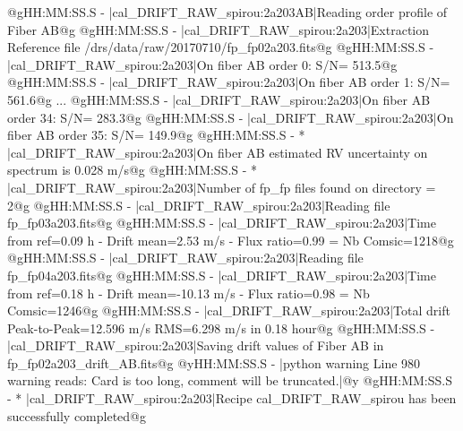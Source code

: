\begin{cmdboxprintspecial}[fontupper=\tiny, fontlower=\tiny]
@gHH:MM:SS.S -   |cal_DRIFT_RAW_spirou:2a203AB|Reading order profile of Fiber AB@g
@gHH:MM:SS.S -   |cal_DRIFT_RAW_spirou:2a203|Extraction Reference file /drs/data/raw/20170710/fp_fp02a203.fits@g
@gHH:MM:SS.S -   |cal_DRIFT_RAW_spirou:2a203|On fiber AB order 0: S/N= 513.5@g
@gHH:MM:SS.S -   |cal_DRIFT_RAW_spirou:2a203|On fiber AB order 1: S/N= 561.6@g
...
@gHH:MM:SS.S -   |cal_DRIFT_RAW_spirou:2a203|On fiber AB order 34: S/N= 283.3@g
@gHH:MM:SS.S -   |cal_DRIFT_RAW_spirou:2a203|On fiber AB order 35: S/N= 149.9@g
@gHH:MM:SS.S - * |cal_DRIFT_RAW_spirou:2a203|On fiber AB estimated RV uncertainty on spectrum is 0.028 m/s@g
@gHH:MM:SS.S - * |cal_DRIFT_RAW_spirou:2a203|Number of fp_fp files found on directory = 2@g
@gHH:MM:SS.S -   |cal_DRIFT_RAW_spirou:2a203|Reading file fp_fp03a203.fits@g
@gHH:MM:SS.S -   |cal_DRIFT_RAW_spirou:2a203|Time from ref=0.09 h  - Drift mean=2.53 m/s - Flux ratio=0.99 = Nb Comsic=1218@g
@gHH:MM:SS.S -   |cal_DRIFT_RAW_spirou:2a203|Reading file fp_fp04a203.fits@g
@gHH:MM:SS.S -   |cal_DRIFT_RAW_spirou:2a203|Time from ref=0.18 h  - Drift mean=-10.13 m/s - Flux ratio=0.98 = Nb Comsic=1246@g
@gHH:MM:SS.S -   |cal_DRIFT_RAW_spirou:2a203|Total drift Peak-to-Peak=12.596 m/s RMS=6.298 m/s in 0.18 hour@g
@gHH:MM:SS.S -   |cal_DRIFT_RAW_spirou:2a203|Saving drift values of Fiber AB in fp_fp02a203_drift_AB.fits@g
@yHH:MM:SS.S - \@ |python warning Line 980  warning reads: Card is too long, comment will be truncated.|@y
@gHH:MM:SS.S - * |cal_DRIFT_RAW_spirou:2a203|Recipe cal_DRIFT_RAW_spirou has been successfully completed@g
\end{cmdboxprintspecial}





